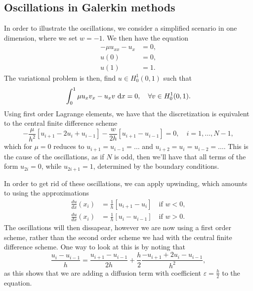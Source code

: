 \subsection{Oscillations in Galerkin methods}
In order to illustrate the oscillations, we consider a simplified scenario in one dimension, where we set $w = -1$.
We then have the equation
\begin{equation}
    \begin{split}
        -\mu u_{xx} - u_x &= 0, \\
        u(0) &= 0, \\
        u(1) &= 1.
    \end{split}
\end{equation}
The variational problem is then, find $u \in H^1_0(0, 1)$ such that
\begin{equation}
    \int_{0}^{1} \mu u_x v_x - u_x v \, \mathop{}\!\mathrm{d} x = 0, \quad \forall v \in H^1_0(0, 1).
\end{equation}
Using first order Lagrange elements, we have that the discretization is equivalent to the central finite difference scheme
\begin{equation}
    -\frac{\mu}{h^2} \left[
        u_{i+1} - 2u_i + u_{i-1}
    \right]
    - \frac{w}{2h} \left[
        u_{i+1} - u_{i-1}
    \right] = 0, \quad i = 1, \ldots, N-1,
\end{equation}
which for $\mu = 0$ reduces to $u_{i + 1} = u_{i - 1} = \ldots$ and $u_{i + 2} = u_i = u_{i - 2} = \ldots$.
This is the cause of the oscillations, as if $N$ is odd, then we'll have that all terms of the form $u_{2i} = 0$, while $u_{2i + 1} = 1$, determined by the boundary conditions.

In order to get rid of these oscillations, we can apply upwinding, which amounts to using the approximations
\begin{equation}
    \begin{split}
        \frac{du}{dx}(x_i) &= \frac{1}{h} \left[
            u_{i+1} - u_{i}
        \right] \quad \text{if } w < 0, \\
        \frac{du}{dx}(x_i) &= \frac{1}{h} \left[
            u_{i} - u_{i-1}
        \right] \quad \text{if } w > 0.
    \end{split}
\end{equation}
The oscillations will then dissapear, however we are now using a first order scheme, rather than the second order scheme we had with the central finite difference scheme.
One way to look at this is by noting that
\begin{equation}
    \frac{u_i - u_{i-1}}{h} = \frac{u_{i + 1} - u_{i - 1}}{2h} + \frac{h}{2} \frac{-u_{i + 1} + 2u_i - u_{i - 1}}{h^2},
\end{equation}
as this shows that we are adding a diffusion term with coefficient $\varepsilon = \frac{h}{2}$ to the equation.

